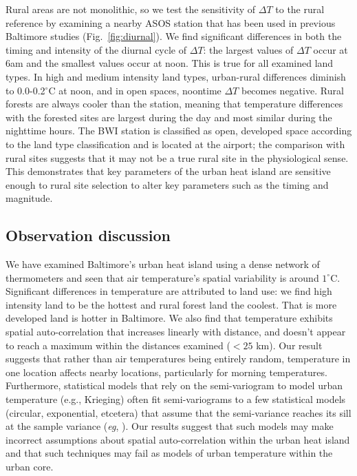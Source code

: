 Rural areas are not monolithic, so we test the sensitivity of $\Delta T$ to the rural reference by examining a nearby ASOS station that has been used in previous Baltimore studies \citep{li2013synergistic} (Fig.~\ref{fig:diurnal}). We find significant differences in both the timing and intensity of the diurnal cycle of $\Delta T$: the largest values of $\Delta T$ occur at 6am and the smallest values occur at noon. This is true for all examined land types. In high and medium intensity land types, urban-rural differences diminish to 0.0-0.2$^\circ$C at noon, and in open spaces, noontime $\Delta T$ becomes negative. Rural forests are always cooler than the station, meaning that temperature differences with the forested sites are largest during the day and most similar during the nighttime hours. The BWI station is classified as open, developed space according to the land type classification and is located at the airport; the comparison with rural sites suggests that it may not be a true rural site in the physiological sense. This demonstrates that key parameters of the urban heat island are sensitive enough to rural site selection to alter key parameters such as the timing and magnitude. 


\subsection{Observation discussion}
We have examined Baltimore's urban heat island using a dense network of thermometers and seen that air temperature's spatial variability is around $1^\circ$C. Significant differences in temperature are attributed to land use: we find high intensity land to be the hottest and rural forest land the coolest. That is more developed land is hotter in Baltimore. We also find that temperature exhibits spatial auto-correlation that increases linearly with distance, and doesn't appear to reach a maximum within the distances examined ($<25$ km). 
 Our result suggests that rather than air temperatures being entirely random, temperature in one location affects nearby locations, particularly for morning temperatures. Furthermore, statistical models that rely on the semi-variogram to model urban temperature (e.g., Krieging) often fit semi-variograms to a few statistical models (circular, exponential, etcetera) that assume that the semi-variance reaches its sill at the sample variance (\textit{eg}, \cite{hardin2017urban}). Our results suggest that such models may make incorrect assumptions about spatial auto-correlation within the urban heat island and that such techniques may fail as models of urban temperature within the urban core.
 
